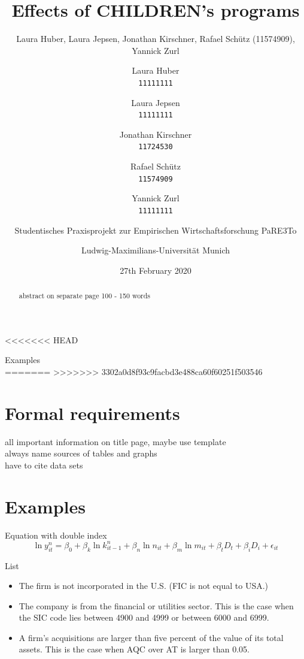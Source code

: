 \documentclass[12pt, a4paper, titlepage]{article}\usepackage[]{graphicx}\usepackage[]{color}
\title{Effects of CHILDREN's programs}
\author{Laura Huber, Laura Jepsen, Jonathan Kirschner, Rafael Schütz (11574909), Yannick Zurl}
\author{
Laura Huber\\
\texttt{11111111}
\and
Laura Jepsen\\
\texttt{11111111}
\and
Jonathan Kirschner\\
\texttt{11724530}
\and
Rafael Schütz\\
\texttt{11574909} 
\and 
Yannick Zurl\\
\texttt{11111111}
\and
Studentisches Praxisprojekt zur Empirischen Wirtschaftsforschung PaRE3To\\
\and
Ludwig-Maximilians-Universität Munich
}
\date{27th February 2020}
\begin{document}
\maketitle

\tableofcontents
\listoftables
\listoffigures

\begin{abstract} 
abstract on separate page
100 - 150 words
\end{abstract}
<<<<<<< HEAD

Examples\\
=======
>>>>>>> 3302a0d8f93c9facbd3e488ca60f60251f503546

\section{Formal requirements}
all important information on title page, maybe use template\\
always name sources of tables and graphs\\
have to cite data sets\\


\section{Examples}

Equation with double index\\

\begin{equation}
\label{ModelProdu}
\ln y_{it}^{n} = \beta_0 + \beta_k \ln k_{it-1}^{n} + \beta_n \ln n_{it} + \beta_m \ln m_{it} + \beta_t D_t + \beta_i D_i + \epsilon_{it}
\end{equation}

List\\

\begin{itemize}
  \item{The firm is not incorporated in the U.S. (FIC is not equal to USA.)}
  \item{The company is from the financial or utilities sector. This is the case when the SIC code lies between 4900 and 4999 or between 6000 and 6999.}
  \item{A firm's acquisitions are larger than five percent of the value of its total assets. This is the case when AQC over AT is larger than 0.05.} 
\end{itemize}
\end{document}
